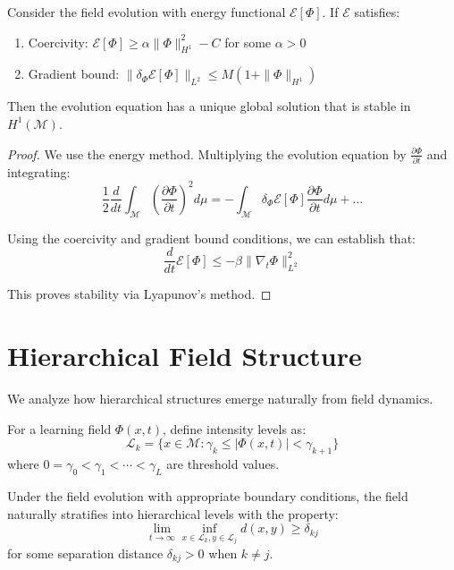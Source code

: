 \begin{theorem}
\label{thm:field_stability}
Consider the field evolution with energy functional $\mathcal{E}[\Phi]$. If $\mathcal{E}$ satisfies:
\begin{enumerate}
\item Coercivity: $\mathcal{E}[\Phi] \geq \alpha \|\Phi\|_{H^1}^2 - C$ for some $\alpha > 0$
\item Gradient bound: $\|\delta_\Phi \mathcal{E}[\Phi]\|_{L^2} \leq M(1 + \|\Phi\|_{H^1})$
\end{enumerate}
Then the evolution equation has a unique global solution that is stable in $H^1(\mathcal{M})$.
\end{theorem}

\begin{proof}
We use the energy method. Multiplying the evolution equation by $\frac{\partial \Phi}{\partial t}$ and integrating:
$$\frac{1}{2}\frac{d}{dt}\int_{\mathcal{M}} \left(\frac{\partial \Phi}{\partial t}\right)^2 d\mu = -\int_{\mathcal{M}} \delta_\Phi \mathcal{E}[\Phi] \frac{\partial \Phi}{\partial t} d\mu + \ldots$$

Using the coercivity and gradient bound conditions, we can establish that:
$$\frac{d}{dt}\mathcal{E}[\Phi] \leq -\beta \|\nabla_t \Phi\|_{L^2}^2$$

This proves stability via Lyapunov's method.
\end{proof}

\section{Hierarchical Field Structure}

We analyze how hierarchical structures emerge naturally from field dynamics.

\begin{definition}
\label{def:field_intensity_levels}
For a learning field $\Phi(x,t)$, define intensity levels as:
$$\mathcal{L}_k = \{x \in \mathcal{M} : \gamma_k \leq |\Phi(x,t)| < \gamma_{k+1}\}$$
where $0 = \gamma_0 < \gamma_1 < \cdots < \gamma_L$ are threshold values.
\end{definition}

\begin{theorem}
\label{thm:hierarchical_emergence}
Under the field evolution with appropriate boundary conditions, the field naturally stratifies into hierarchical levels with the property:
$$\lim_{t \to \infty} \inf_{x \in \mathcal{L}_k, y \in \mathcal{L}_j} d(x,y) \geq \delta_{kj}$$
for some separation distance $\delta_{kj} > 0$ when $k \neq j$.
\end{theorem}


